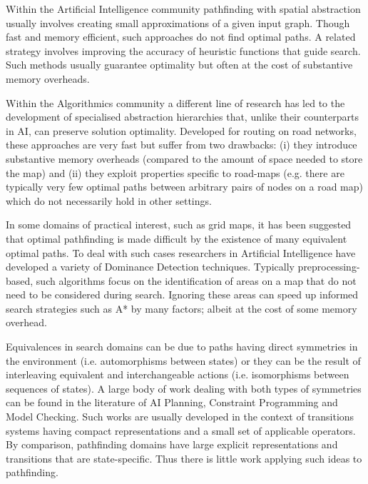 Within the Artificial Intelligence community pathfinding with spatial
abstraction usually involves creating small approximations of a given input
graph.  Though fast and memory efficient, such approaches do not find optimal
paths.  A related strategy involves improving the accuracy of heuristic
functions that guide search. Such methods usually guarantee optimality but
often at the cost of substantive memory overheads.

Within the Algorithmics community a different line of research has led to the
development of specialised abstraction hierarchies that, unlike their
counterparts in AI, can preserve solution optimality. Developed for routing on
road networks, these approaches are very fast but suffer from two drawbacks:
(i) they introduce substantive memory overheads (compared to the amount of
space needed to store the map) and (ii) they exploit properties specific to
road-maps (e.g. there are typically very few optimal paths between arbitrary
pairs of nodes on a road map) which do not necessarily hold in other settings.

In some domains of practical interest, such as grid maps, it has been
suggested that optimal pathfinding is made difficult by the existence of many
equivalent optimal paths. To deal with such cases researchers in Artificial
Intelligence have developed a variety of Dominance Detection techniques.
Typically preprocessing-based, such algorithms focus on the identification of
areas on a map that do not need to be considered during search. Ignoring these
areas can speed up informed search strategies such as A{*} by many factors;
albeit at the cost of some memory overhead.

Equivalences in search domains can be due to paths having direct symmetries in
the environment (i.e.  automorphisms between states) or they can be the result
of interleaving equivalent and interchangeable actions (i.e. isomorphisms
between sequences of states). A large body of work dealing with both types of
symmetries can be found in the literature of AI Planning, Constraint
Programming and Model Checking. Such works are usually developed in the
context of transitions systems having compact representations and a small set
of applicable operators. By comparison, pathfinding domains have large
explicit representations and transitions that are state-specific.  Thus there
is little work applying such ideas to pathfinding.

